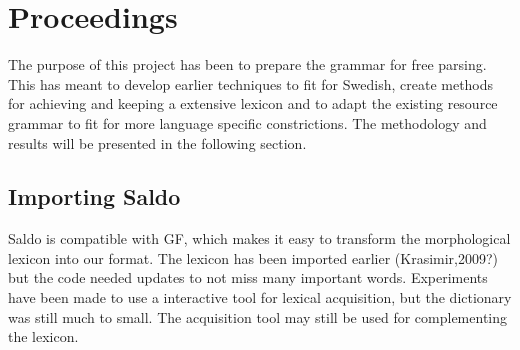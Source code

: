 \documentclass{report}
\begin{document}
\chapter{Proceedings}
The purpose of this project has been to prepare the grammar for free parsing.
This has meant to develop earlier techniques to fit for Swedish, create methods
for achieving and keeping a extensive lexicon and to adapt the existing
resource grammar to fit for more language specific constrictions.
The methodology and results will be presented in the following section.

\section{Importing Saldo}
\label{sec:prog.saldo}
Saldo is compatible with GF, which makes it easy to transform the morphological
lexicon into our format. The lexicon has been imported earlier (Krasimir,2009?)
but the code needed updates to not miss many important words.
Experiments have been made to use a interactive tool for lexical acquisition,
but the dictionary was still much to small. The acquisition tool may still
be used for complementing the lexicon.
\end{document}
